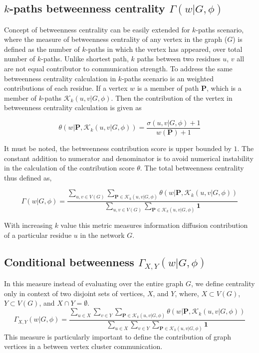 \documentclass{article}
\begin{document}
\subsection{$k$-paths betweenness centrality $\Gamma(w\vert G,\phi)$}\label{sec:btwcent}
Concept of betweenness centrality can be easily extended for $k$-paths scenario, where the measure of betweenness centrality of any vertex in the graph ($G$) is defined as the number of $k$-paths in which the vertex has appeared, over total number of $k$-paths. Unlike shortest path, $k$ paths between two residues $u$, $v$ all are not equal contributor to communication strength. To address the same betweenness centrality calculation in $k$-paths scenario is an weighted contributions of each residue. If a vertex $w$ is a member of path $\mathbf{P}$, which is a member of $k$-paths $\mathcal{K}_k(u,v\vert G,\phi)$. Then the contribution of the vertex in betweenness centrality calculation is given as 

\begin{equation*}
    \theta(w \vert \mathbf{P}, \mathcal{K}_k(u,v\vert G,\phi)) = \frac{ \sigma(u,v\vert G, \phi) + 1 }{ w(\mathbf{P}) + 1 }
\end{equation*}

It must be noted, the betweenness contribution score is upper bounded by $1$. The constant addition to numerator and denominator is to avoid numerical instability in the calculation of the contribution score $\theta$. The total betweenness centrality thus defined as,

\begin{equation*}
    \Gamma(w \vert G, \phi) = \dfrac{\sum_{u,v \in V(G)} \sum_{\mathbf{P}\in \mathcal{K}_k(u,v\vert G,\phi)} \theta(w \vert \mathbf{P}, \mathcal{K}_k(u,v\vert G,\phi))}{ \sum_{u,v \in V(G)} \sum_{\mathbf{P}\in \mathcal{K}_k(u,v\vert G,\phi)} \mathbf{1} }
\end{equation*}

With increasing $k$ value this metric measures information diffusion contribution of a particular residue $u$ in the network $G$. 

\subsection{Conditional betweenness $\Gamma_{X,Y}(w \vert G, \phi)$}
In this measure instead of evaluating over the entire graph $G$, we define centrality only in context of two disjoint sets of vertices, $X$, and $Y$, where, $X \subset V(G)$, $Y \subset V(G)$, and $X \cap Y = \emptyset$. 
\begin{equation*}
    \Gamma_{X,Y}(w \vert G, \phi) = \dfrac{\sum_{u \in X} \sum_{v \in Y} \sum_{\mathbf{P}\in \mathcal{K}_k(u,v\vert G,\phi)} \theta(w \vert \mathbf{P}, \mathcal{K}_k(u,v\vert G,\phi))}{ \sum_{u \in X} \sum_{v \in Y} \sum_{\mathbf{P}\in \mathcal{K}_k(u,v\vert G,\phi)} \mathbf{1} }
\end{equation*}
This measure is particularly important to define the contribution of graph vertices in a between vertex cluster communication. 
\end{document}
